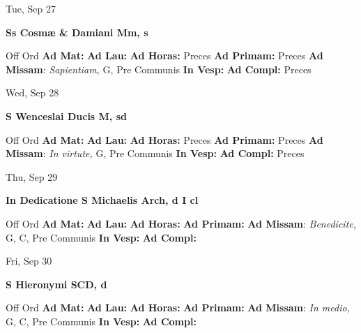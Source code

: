 \documentclass[10pt]{article}
\begin{document}
\begin{minipage}{3.5in}
\vspace{2em}\begin{center}
Tue, Sep 27
\end{center}\textbf{ \large Ss Cosmæ \& Damiani Mm, \textnormal{\normalsize s}}
\begin{justify}
Off Ord
\textbf{Ad Mat: }
\textbf{Ad Lau: }
\textbf{Ad Horas: }Preces
\textbf{Ad Primam: }Preces
\textbf{Ad Missam}: \textit{Sapientiam,} G, Pre Communis
\textbf{In Vesp: }
\textbf{Ad Compl: }Preces\end{justify}
\end{minipage}



\begin{minipage}{3.5in}
\vspace{2em}\begin{center}
Wed, Sep 28
\end{center}\textbf{ \large S Wenceslai Ducis M, \textnormal{\normalsize sd}}
\begin{justify}
Off Ord
\textbf{Ad Mat: }
\textbf{Ad Lau: }
\textbf{Ad Horas: }Preces
\textbf{Ad Primam: }Preces
\textbf{Ad Missam}: \textit{In virtute,} G, Pre Communis
\textbf{In Vesp: }
\textbf{Ad Compl: }Preces\end{justify}
\end{minipage}



\begin{minipage}{3.5in}
\vspace{2em}\begin{center}
Thu, Sep 29
\end{center}\textbf{ \large In Dedicatione S Michaelis Arch, \textnormal{\normalsize d I cl}}
\begin{justify}
Off Ord
\textbf{Ad Mat: }
\textbf{Ad Lau: }
\textbf{Ad Horas: }
\textbf{Ad Primam: }
\textbf{Ad Missam}: \textit{Benedicite,} G, C, Pre Communis
\textbf{In Vesp: }
\textbf{Ad Compl: }\end{justify}
\end{minipage}



\begin{minipage}{3.5in}
\vspace{2em}\begin{center}
Fri, Sep 30
\end{center}\textbf{ \large S Hieronymi SCD, \textnormal{\normalsize d}}
\begin{justify}
Off Ord
\textbf{Ad Mat: }
\textbf{Ad Lau: }
\textbf{Ad Horas: }
\textbf{Ad Primam: }
\textbf{Ad Missam}: \textit{In medio,} G, C, Pre Communis
\textbf{In Vesp: }
\textbf{Ad Compl: }\end{justify}
\end{minipage}
\end{document}
